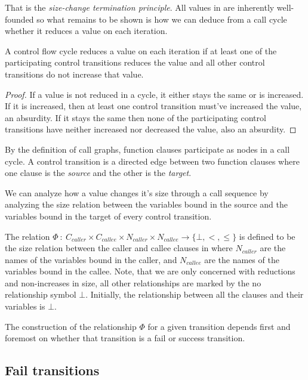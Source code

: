 That is the \emph{size-change termination principle}. All values in \D{} are
inherently well-founded so what remains to be shown is how we can deduce from a
call cycle whether it reduces a value on each iteration.

\begin{lemma}\label{lemma:cycle-reduce} A control flow cycle reduces a value on
each iteration if at least one of the participating control transitions reduces
the value and all other control transitions do not increase that
value.\end{lemma}

\begin{proof} If a value is not reduced in a cycle, it either stays the same or
is increased. If it is increased, then at least one control transition must've
increased the value, an absurdity. If it stays the same then none of the
participating control transitions have neither increased nor decreased the
value, also an absurdity. \end{proof}

By the definition of call graphs, function clauses participate as nodes in a
call cycle. A control transition is a directed edge between two function
clauses where one clause is the \emph{source} and the other is the
\emph{target}. 

We can analyze how a value changes it's size through a call sequence by
analyzing the size relation between the variables bound in the source and the
variables bound in the target of every control transition.

\begin{definition} The relation $\Phi\ :\ C_{caller} \times C_{callee} \times
N_{caller} \times N_{callee} \rightarrow \{\bot,<,\leq\}$ is defined to be the
size relation between the caller and callee
clauses in \D{} where $N_{caller}$ are the names of the variables bound in the
caller, and $N_{callee}$ are the names of the variables bound in the callee.
Note, that we are only concerned with reductions and non-increases in size, all
other relationships are marked by the no relationship symbol $\bot$. Initially,
the relationship between all the clauses and their variables is $\bot$.
\end{definition}

The construction of the relationship $\Phi$ for a given transition depends
first and foremost on whether that transition is a fail or success transition.

\subsection{Fail transitions}

